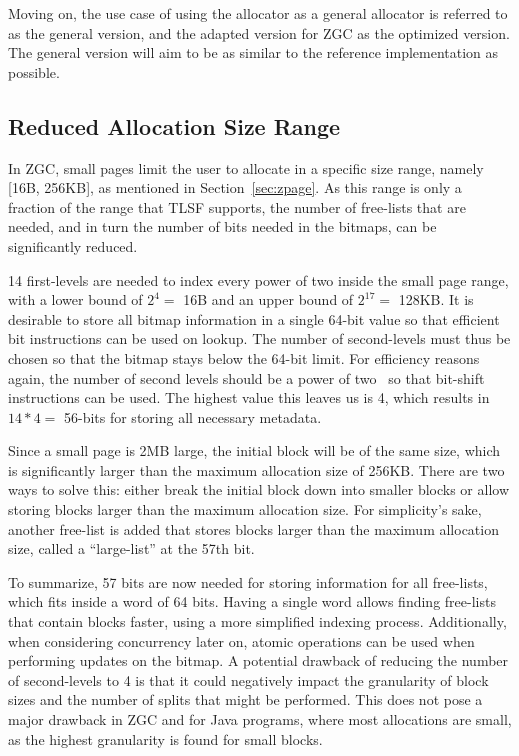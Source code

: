 Moving on, the use case of using the allocator as a general allocator is referred to as the general version, and the adapted version for ZGC as the optimized version. The general version will aim to be as similar to the reference implementation as possible.

\subsection{Reduced Allocation Size Range}
\label{sec:adaptations:reduced_allocation_range}

In ZGC, small pages limit the user to allocate in a specific size range, namely [16B, 256KB], as mentioned in Section~\ref{sec:zpage}. As this range is only a fraction of the range that TLSF supports, the number of free-lists that are needed, and in turn the number of bits needed in the bitmaps, can be significantly reduced.

14 first-levels are needed to index every power of two inside the small page range, with a lower bound of $2^4 =$ 16B and an upper bound of $2^{17} =$ 128KB. It is desirable to store all bitmap information in a single 64-bit value so that efficient bit instructions can be used on lookup. The number of second-levels must thus be chosen so that the bitmap stays below the 64-bit limit. For efficiency reasons again, the number of second levels should be a power of two~\cite{TLSF} so that bit-shift instructions can be used. The highest value this leaves us is 4, which results in $14 * 4 =$ 56-bits for storing all necessary metadata.

Since a small page is 2MB large, the initial block will be of the same size, which is significantly larger than the maximum allocation size of 256KB. There are two ways to solve this: either break the initial block down into smaller blocks or allow storing blocks larger than the maximum allocation size. For simplicity's sake, another free-list is added that stores blocks larger than the maximum allocation size, called a ``large-list'' at the 57th bit.

To summarize, 57 bits are now needed for storing information for all free-lists, which fits inside a word of 64 bits. Having a single word allows finding free-lists that contain blocks faster, using a more simplified indexing process. Additionally, when considering concurrency later on, atomic operations can be used when performing updates on the bitmap. A potential drawback of reducing the number of second-levels to 4 is that it could negatively impact the granularity of block sizes and the number of splits that might be performed. This does not pose a major drawback in ZGC and for Java programs, where most allocations are small, as the highest granularity is found for small blocks.

